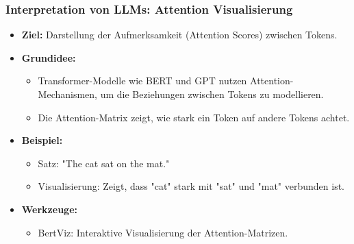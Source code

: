 \documentclass[aspectratio=1610, xcolor=dvipsnames, 9pt]{beamer}
\begin{document}
\begin{frame}
  \frametitle{Interpretation von LLMs: Attention Visualisierung}
  \begin{itemize}
    \item \textbf{Ziel:} Darstellung der Aufmerksamkeit (Attention Scores) zwischen Tokens.
    \item \textbf{Grundidee:}
    \begin{itemize}
      \item Transformer-Modelle wie BERT und GPT nutzen Attention-Mechanismen, um die Beziehungen zwischen Tokens zu modellieren.
      \item Die Attention-Matrix zeigt, wie stark ein Token auf andere Tokens achtet.
    \end{itemize}
    \item \textbf{Beispiel:}
    \begin{itemize}
      \item Satz: "The cat sat on the mat."
      \item Visualisierung: Zeigt, dass "cat" stark mit "sat" und "mat" verbunden ist.
    \end{itemize}
    \item \textbf{Werkzeuge:}
    \begin{itemize}
      \item BertViz: Interaktive Visualisierung der Attention-Matrizen.
    \end{itemize}
  \end{itemize}
\end{frame}
\end{document}

